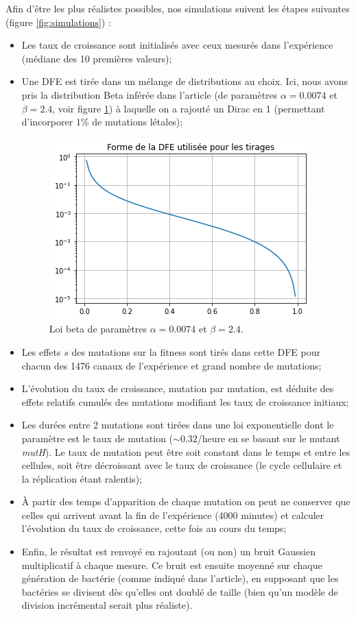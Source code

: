 \documentclass[12pt]{article}
\begin{document}
Afin d'être les plus réalistes possibles, nos simulations suivent les étapes suivantes (figure \ref{fig:simulations}) :
\begin{itemize}
\item Les taux de croissance sont initialisés avec ceux mesurés dans l'expérience (médiane des 10 premières valeurs);
\item Une DFE est tirée dans un mélange de distributions au choix. Ici, nous avons pris la distribution Beta inférée dans l'article (de paramètres $\alpha=0.0074$ et $\beta=2.4$, voir figure \ref{fig:lbeta}) à laquelle on a rajouté un Dirac en 1 (permettant d'incorporer $1\%$ de mutations létales);
  \begin{figure}[h]
    \begin{center}
      \includegraphics[scale=0.45]{./img/lbeta.png}
    \end{center} 
    \caption{\label{fig:lbeta}Loi beta de paramètres $\alpha=0.0074$ et $\beta=2.4$.}
  \end{figure}
\item Les effets $s$ des mutations sur la fitness sont tirés dans cette DFE pour chacun des 1476 canaux de l'expérience et grand nombre de mutations;
\item L'évolution du taux de croissance, mutation par mutation, est déduite des effets relatifs cumulés des mutations modifiant les taux de croissance initiaux;
\item Les durées entre 2 mutations sont tirées dans une loi exponentielle dont le paramètre est le taux de mutation ($\sim0.32$/heure en se basant sur le mutant \emph{mutH}). Le taux de mutation peut être soit constant dans le temps et entre les cellules, soit être décroissant avec le taux de croissance (le cycle cellulaire et la réplication étant ralentis);
\item À partir des temps d'apparition de chaque mutation on peut ne conserver que celles qui arrivent avant la fin de l'expérience (4000 minutes) et calculer l'évolution du taux de croissance, cette fois au cours du temps;
\item Enfin, le résultat est renvoyé en rajoutant (ou non) un bruit Gaussien multiplicatif à chaque mesure. Ce bruit est ensuite moyenné sur chaque génération de bactérie (comme indiqué dans l'article), en supposant que les bactéries se divisent dès qu'elles ont doublé de taille (bien qu'un modèle de division incrémental serait plus réaliste).
\end{itemize}
\end{document}
